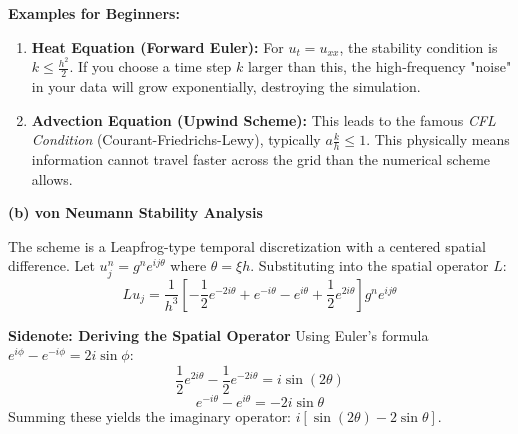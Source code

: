 \begin{solution}
\textbf{Examples for Beginners:}
\begin{enumerate}
    \item \textbf{Heat Equation (Forward Euler):} For $u_t = u_{xx}$, the stability condition is $k \leq \frac{h^2}{2}$. If you choose a time step $k$ larger than this, the high-frequency "noise" in your data will grow exponentially, destroying the simulation.
    \item \textbf{Advection Equation (Upwind Scheme):} This leads to the famous \textit{CFL Condition} (Courant-Friedrichs-Lewy), typically $a \frac{k}{h} \leq 1$. This physically means information cannot travel faster across the grid than the numerical scheme allows.
\end{enumerate}

\textbf{(b) von Neumann Stability Analysis}

The scheme is a Leapfrog-type temporal discretization with a centered spatial difference. Let $u_j^n = g^n e^{ij\theta}$ where $\theta = \xi h$.
Substituting into the spatial operator $L$:
\[ L u_j = \frac{1}{h^3} \left[ -\frac{1}{2} e^{-2i\theta} + e^{-i\theta} - e^{i\theta} + \frac{1}{2} e^{2i\theta} \right] g^n e^{ij\theta} \]

\textbf{Sidenote: Deriving the Spatial Operator}
Using Euler's formula $e^{i\phi} - e^{-i\phi} = 2i\sin\phi$:
\[ \frac{1}{2} e^{2i\theta} - \frac{1}{2} e^{-2i\theta} = i\sin(2\theta) \]
\[ e^{-i\theta} - e^{i\theta} = -2i\sin\theta \]
Summing these yields the imaginary operator: $i[\sin(2\theta) - 2\sin\theta]$.


\end{solution}
